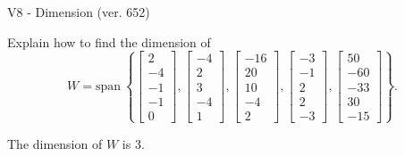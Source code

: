 \begin{exercise}
  \begin{exerciseTitle}V8 - Dimension (ver. 652)\end{exerciseTitle}
  \begin{exerciseStatement}
    Explain how to find the dimension of 
\[W=\mathrm{span}\ \left\{\left[\begin{array}{r}
2 \\
-4 \\
-1 \\
-1 \\
0
\end{array}\right] , \left[\begin{array}{r}
-4 \\
2 \\
3 \\
-4 \\
1
\end{array}\right] , \left[\begin{array}{r}
-16 \\
20 \\
10 \\
-4 \\
2
\end{array}\right] , \left[\begin{array}{r}
-3 \\
-1 \\
2 \\
2 \\
-3
\end{array}\right] , \left[\begin{array}{r}
50 \\
-60 \\
-33 \\
30 \\
-15
\end{array}\right]\right\}.\]



  \end{exerciseStatement}
  \begin{exerciseAnswer}
   The dimension of \(W\) is  \(3\).
  


  \end{exerciseAnswer}
\end{exercise}